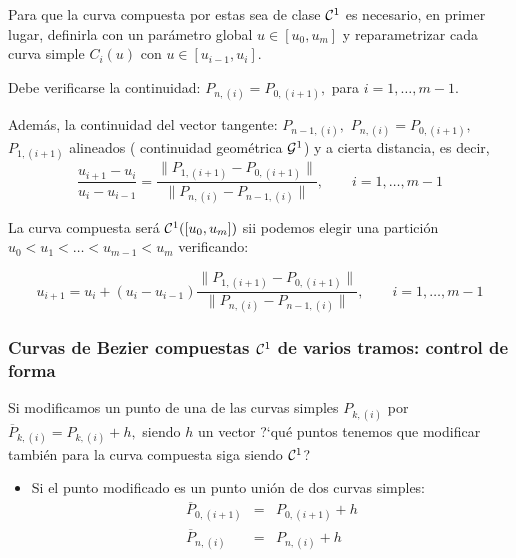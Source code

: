 \documentclass[twoside]{report}
\begin{document}
Para que la curva compuesta por estas sea de clase ${\cal C}^1$ es necesario, en primer lugar, definirla con un parámetro
global $u\in [u_0,u_m]$ y reparametrizar cada curva simple $C_i(u)$ con $u\in [u_{i-1},u_i]$.

Debe verificarse la continuidad: $P_{n, (i)}=P_{0,(i+1)},$ para $i=1,\ldots,m-1$.

Además, la continuidad del vector tangente: $P_{n-1, (i)},$ $P_{n, (i)}=P_{0,(i+1)},$ $P_{1,(i+1)}$ alineados ( continuidad geométrica ${\cal G}^1$) y a cierta distancia, es decir,
$$\frac{u_{i+1}-u_i}{u_i-u_{i-1}} = \frac{\parallel P_{1,(i+1)}-P_{0,(i+1)}\parallel}{\parallel P_{n, (i)}-P_{n-1,(i)} \parallel},\quad \quad i=1,\ldots,m-1$$

\vspace{0.2cm}

La curva compuesta será ${\cal C}^1([u_0,u_m])$ sii podemos elegir una partición $u_0<u_1<\ldots<u_{m-1}<u_m$ verificando:

$$u_{i+1}=u_i+(u_i-u_{i-1}) \frac{\parallel P_{1,(i+1)}-P_{0,(i+1)}\parallel}{\parallel P_{n, (i)}-P_{n-1,(i)}
\parallel},\quad \quad i=1,\ldots,m-1$$

%

\subsubsection{Curvas de Bezier compuestas ${\cal C}^1$ de varios tramos: control de forma}

Si modificamos un punto de una de las curvas simples $P_{k, (i)}$ por $\overline{P}_{k, (i)}=P_{k, (i)}+h,$ siendo $h$ un vector ?`qué puntos tenemos que modificar también para la curva compuesta siga siendo ${\cal C}^1$?

\begin{itemize}
\item Si el punto modificado es un punto unión de dos curvas simples:
$$\begin{array}{rcl} \overline{P}_{0, (i+1)}&=&P_{0, (i+1)}+h\\ \overline{P}_{n, (i)}&=&P_{n, (i)}+h\\ \end{array}$$
\end{itemize}
\end{document}
